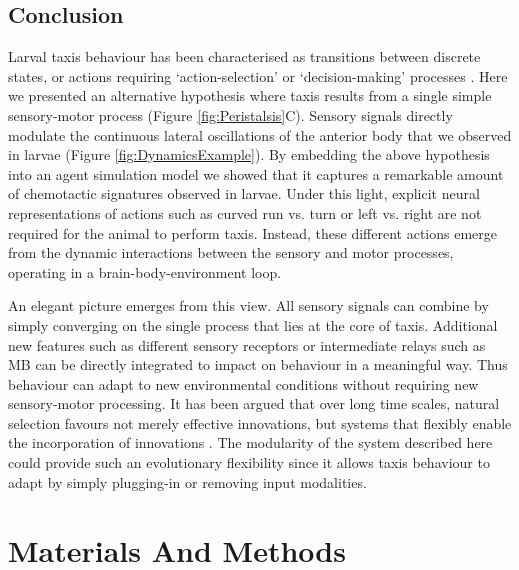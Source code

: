 \documentclass[11pt,a4paper]{article}
\newcommand{\todoBW}[1]{\todo[author=BW,color=orange, size=\tiny,inline]{#1}}
\begin{document}
\subsection{Conclusion}
Larval taxis behaviour has been characterised as transitions between discrete states, or actions \citep{green1983organization, cobbwhatandhow1999, gomez2012active}  requiring ‘action-selection’ or ‘decision-making’ processes \citep{gomez2014multilevel}. Here we presented an alternative hypothesis where taxis results from a single simple sensory-motor process (Figure \ref{fig:Peristalsis}C). Sensory signals directly modulate the continuous lateral oscillations of the anterior body that we observed in larvae (Figure \ref{fig:DynamicsExample}).
By embedding the above hypothesis into an agent simulation model we showed that it captures a remarkable amount of chemotactic signatures observed in larvae. Under this light, explicit neural representations of actions such as curved run vs. turn or left vs. right are not required for the animal to perform taxis. Instead, these different actions emerge from the dynamic interactions between the sensory and motor processes, operating in a brain-body-environment loop.

An elegant picture emerges from this view. All sensory signals can combine by simply converging on the single process that lies at the core of taxis. Additional new features such as different sensory receptors or intermediate relays such as MB can be directly integrated to impact on behaviour in a meaningful way. Thus behaviour can adapt to new environmental conditions  without requiring new sensory-motor processing. It has been argued that over long time scales, natural selection favours not merely effective innovations, but systems that flexibly enable the incorporation of innovations \citep{vermeij1973adaptation}. The modularity of the system described here could provide such an evolutionary flexibility since it allows taxis behaviour to adapt by simply plugging-in or removing input modalities.


\section{Materials And Methods}
\end{document}
